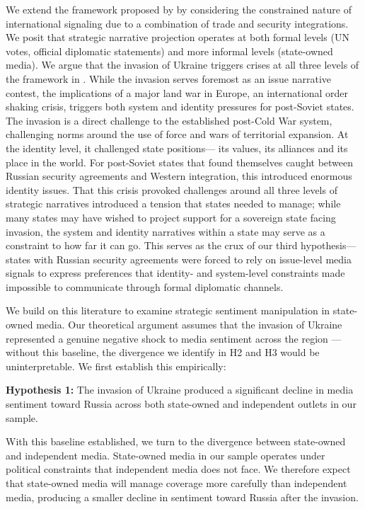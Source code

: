 \documentclass[12pt]{article}
\begin{document}
We extend the framework proposed by \citet{miskimmon_strategic_2013} by considering the constrained nature of international signaling due to a combination of trade and security integrations. We posit that strategic narrative projection operates at both formal levels (UN votes, official diplomatic statements) and more informal levels (state-owned media). We argue that the invasion of Ukraine triggers crises at all three levels of the framework in \citet{miskimmon_strategic_2013}. While the invasion serves foremost as an issue narrative contest, the implications of a major land war in Europe, an international order shaking crisis, triggers both system and identity pressures for post-Soviet states. The invasion is a direct challenge to the established post-Cold War system, challenging norms around the use of force and wars of territorial expansion. At the identity level, it challenged state positions--- its values, its alliances and its place in the world. For post-Soviet states that found themselves caught between Russian security agreements and Western integration, this introduced enormous identity issues. That this crisis provoked challenges around all three levels of strategic narratives introduced a tension that states needed to manage; while many states may have wished to project support for a sovereign state facing invasion, the system and identity narratives within a state may serve as a constraint to how far it can go. This serves as the crux of our third hypothesis--- states with Russian security agreements were forced to rely on issue-level media signals to express preferences that identity- and system-level constraints made impossible to communicate through formal diplomatic channels.

We build on this literature to examine strategic sentiment manipulation in state-owned media. Our theoretical argument assumes that the invasion of Ukraine represented a genuine negative shock to media sentiment across the region — without this baseline, the divergence we identify in H2 and H3 would be uninterpretable. We first establish this empirically:

\textbf{Hypothesis 1:} The invasion of Ukraine produced a significant decline in media sentiment toward Russia across both state-owned and independent outlets in our sample.

With this baseline established, we turn to the divergence between state-owned and independent media. State-owned media in our sample operates under political constraints that independent media does not face. We therefore expect that state-owned media will manage coverage more carefully than independent media, producing a smaller decline in sentiment toward Russia after the invasion.
\end{document}
